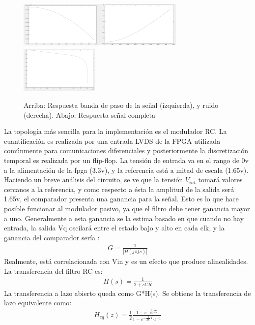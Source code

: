 \documentclass[a4paper,conference]{IEEEtran}
\begin{document}
\begin{figure}[!b]
\centering
\includegraphics[height=0.9in]{Respuesta_BP_Modulador_Combinada}
\centering
\includegraphics[height=0.9in]{Respuesta_Modulador_Completa}
\caption{Arriba: Respuesta banda de paso de la se\~nal (izquierda), y ruido (derecha). Abajo: Respuesta se\~nal completa}
\label{fig_5}
\end{figure}
La topolog\'ia m\'as sencilla para la implementaci\'on es el modulador RC. La cuantificaci\'on es realizada por una entrada LVDS de la FPGA utilizada com\'unmente para comunicaciones diferenciales y posteriormente la discretizaci\'on temporal es realizada por un flip-flop. La tensi\'on de entrada va en el rango de 0v a la alimentación de la fpga (3.3v), y la referencia está a mitad de escala (1.65v).  Haciendo un breve an\'alisis del circuito, se ve que la tensi\'on $V_{int}$ tomar\'a valores cercanos a la referencia, y como respecto a \'esta la amplitud de la salida ser\'a 1.65v, el comparador presenta una ganancia para la se\~nal. Esto es lo que hace posible funcionar al modulador pasivo, ya que el filtro debe tener ganancia mayor a uno. Generalmente a esta ganancia se la estima basado en que cuando no hay entrada, la salida Vq oscilar\'a entre el estado bajo y alto en cada clk, y la ganancia del comparador ser\'ia :
\begin{align}
G=\frac{1}{|H(j\pi fs)|}
\end{align}
Realmente, está correlacionada con Vin y es un efecto que produce alinealidades. La transferencia del filtro RC es:
\begin{align}
H(s)=\frac{1}{2+sCR}
\end{align}
La transferencia a lazo abierto queda como G*H(s). 
Se obtiene la transferencia de lazo equivalente como:
\begin{align}
H_{eq}(z)=\frac{1}{2}\frac{1-e^{-\frac{2}{RC}T_s}}{1-e^{-\frac{2}{RC}T_s}z^{-1}}
\end{align}
\end{document}
